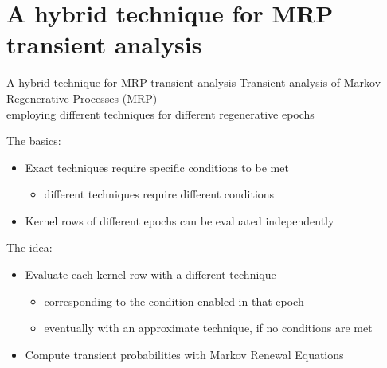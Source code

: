 
\section{A hybrid technique for MRP transient analysis}
  \begin{frame}{A hybrid technique for MRP transient analysis}
    Transient analysis of Markov Regenerative Processes (MRP)\\
    employing different techniques for different regenerative epochs
    
    \vspace{1em}
    The basics:
    \begin{itemize}
      \item Exact techniques require specific conditions to be met
      \begin{itemize}
        \item different techniques require different conditions
      \end{itemize}
      \item Kernel rows of different epochs can be evaluated independently
    \end{itemize}
    
    \vspace{1em}
    The idea:
    \begin{itemize}
      \item Evaluate each kernel row with a different technique
      \begin{itemize}
        \item corresponding to the condition enabled in that epoch
        \item eventually with an approximate technique, if no conditions are met
      \end{itemize}
      \item Compute transient probabilities with Markov Renewal Equations
    \end{itemize}
  \end{frame}
  
